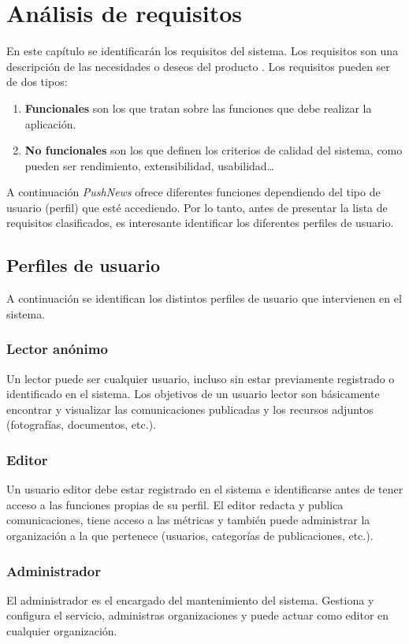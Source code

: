 \chapter{Análisis de requisitos}
En este capítulo se identificarán los requisitos del sistema. Los requisitos son una descripción de las necesidades o deseos del producto \cite{Larman2004}. Los requisitos pueden ser de dos tipos:
\begin{enumerate}
    \item \textbf{Funcionales} son los que tratan sobre las funciones que debe realizar la aplicación.
    \item \textbf{No funcionales} son los que definen los criterios de calidad del sistema, como pueden ser rendimiento, extensibilidad, usabilidad\dots
\end{enumerate}

A continuación \emph{PushNews} ofrece diferentes funciones dependiendo del tipo de usuario (perfil) que esté accediendo. Por lo tanto, antes de presentar la lista de requisitos clasificados, es interesante identificar los diferentes perfiles de usuario.

\section {Perfiles de usuario}
A continuación se identifican los distintos perfiles de usuario que intervienen en el sistema.

\subsection{Lector anónimo}
Un lector puede ser cualquier usuario, incluso sin estar previamente registrado o identificado en el sistema. Los objetivos de un usuario lector son básicamente encontrar y visualizar las comunicaciones publicadas y los recursos adjuntos (fotografías, documentos, etc.).

\subsection{Editor}
Un usuario editor debe estar registrado en el sistema e identificarse antes de tener acceso a las funciones propias de su perfil. El editor redacta y publica comunicaciones, tiene acceso a las métricas y también puede administrar la organización a la que pertenece (usuarios, categorías de publicaciones, etc.).

\subsection{Administrador}
El administrador es el encargado del mantenimiento del sistema. Gestiona y configura el servicio, administras organizaciones y puede actuar como editor en cualquier organización. 

